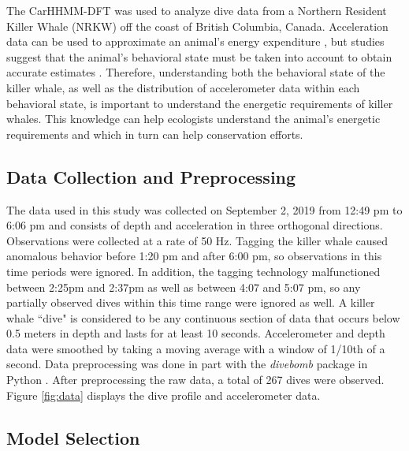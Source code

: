 

The CarHHMM-DFT was used to analyze dive data from a Northern Resident Killer Whale (NRKW) off the coast of British Columbia, Canada. Acceleration data can be used to approximate an animal's energy expenditure \citep{Green:2009}, but studies suggest that the animal's behavioral state must be taken into account to obtain accurate estimates \citep{Dot:2016}. Therefore, understanding both the behavioral state of the killer whale, as well as the distribution of accelerometer data within each behavioral state, is important to understand the energetic requirements of killer whales. This knowledge can help ecologists understand the animal's energetic requirements and which in turn can help conservation efforts.

\subsection{Data Collection and Preprocessing}

The data used in this study was collected on September 2, 2019 from 12:49 pm to 6:06 pm and consists of depth and acceleration in three orthogonal directions. Observations were collected at a rate of 50 Hz. Tagging the killer whale caused anomalous behavior before 1:20 pm and after 6:00 pm, so observations in this time periods were ignored. In addition, the tagging technology malfunctioned between 2:25pm and 2:37pm as well as between 4:07 and 5:07 pm, so any partially observed dives within this time range were ignored as well. A killer whale ``dive" is considered to be any continuous section of data that occurs below 0.5 meters in depth and lasts for at least 10 seconds. Accelerometer and depth data were smoothed by taking a moving average with a window of 1/10th of a second. Data preprocessing was done in part with the \textit{divebomb} package in Python \citep{Nunes:2018}. After preprocessing the raw data, a total of 267 dives were observed. Figure \ref{fig:data} displays the dive profile and accelerometer data.

\subsection{Model Selection}

